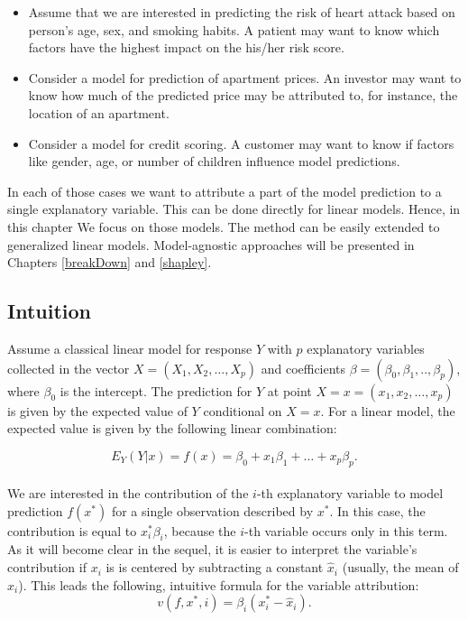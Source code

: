 \documentclass[]{krantz}
\providecommand{\tightlist}{%
  \setlength{\itemsep}{0pt}\setlength{\parskip}{0pt}}
\theoremstyle{definition}
\theoremstyle{definition}
\theoremstyle{definition}
\theoremstyle{remark}
\begin{document}
\begin{itemize}
\tightlist
\item
  Assume that we are interested in predicting the risk of heart attack
  based on person's age, sex, and smoking habits. A patient may want to
  know which factors have the highest impact on the his/her risk score.
\item
  Consider a model for prediction of apartment prices. An investor may
  want to know how much of the predicted price may be attributed to, for
  instance, the location of an apartment.
\item
  Consider a model for credit scoring. A customer may want to know if
  factors like gender, age, or number of children influence model
  predictions.
\end{itemize}

In each of those cases we want to attribute a part of the model
prediction to a single explanatory variable. This can be done directly
for linear models. Hence, in this chapter We focus on those models. The
method can be easily extended to generalized linear models.
Model-agnostic approaches will be presented in Chapters \ref{breakDown}
and \ref{shapley}.

\hypertarget{intuition-1}{%
\subsection{Intuition}\label{intuition-1}}

Assume a classical linear model for response \(Y\) with \(p\)
explanatory variables collected in the vector
\(X = (X_1, X_2, \ldots, X_p)\) and coefficients
\(\beta = (\beta_0, \beta_1, .., \beta_p)\), where \(\beta_0\) is the
intercept. The prediction for \(Y\) at point
\(X=x=(x_1, x_2, \ldots, x_p)\) is given by the expected value of \(Y\)
conditional on \(X=x\). For a linear model, the expected value is given
by the following linear combination:

\[
E_Y(Y | x) = f(x) = \beta_0 + x_1 \beta_1 + \ldots + x_p \beta_p.
\]\\
We are interested in the contribution of the \(i\)-th explanatory
variable to model prediction \(f(x^*)\) for a single observation
described by \(x^*\). In this case, the contribution is equal to
\(x^*_i\beta_i\), because the \(i\)-th variable occurs only in this
term. As it will become clear in the sequel, it is easier to interpret
the variable's contribution if \(x_i\) is is centered by subtracting a
constant \(\hat x_i\) (usually, the mean of \(x_i\)). This leads the
following, intuitive formula for the variable attribution: \[
v(f, x^*, i) = \beta_i (x_i^* - \hat x_i).
\]
\end{document}
